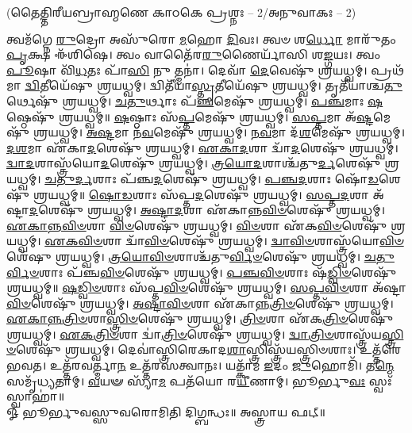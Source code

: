 \centerline{\scriptsize (𑌤𑍈𑌤𑍍𑌤𑌿𑌰𑍀𑌯𑌬𑍍𑌰𑌾𑌹𑍍𑌮𑌣𑍇 𑌕𑌾𑌠𑌕𑍇 𑌪𑍍𑌰𑌶𑍍𑌨𑌃 – 2/𑌅𑌨𑍁𑌵𑌾𑌕𑌃 – 2)}
 𑌤𑍍𑌵𑌮᳴𑌗𑍍𑌨𑍇 \ul{𑌰𑍁}\-𑌦𑍍𑌰𑍋 𑌅𑌸𑍁᳴𑌰𑍋 \ul{𑌮}\-𑌹𑍋 \ul{𑌦𑌿}\-𑌵𑌃। 𑌤𑍍𑌵𑍞 𑌶\-\ul{𑌰𑍍𑌧𑍋} 𑌮𑌾𑌰𑍁᳴𑌤𑌂 \ul{𑌪𑍃}\-𑌕𑍍𑌷 𑌈᳴𑌶𑌿𑌷𑍇।
 𑌤𑍍𑌵𑌂 𑌵𑌾𑌤𑍈᳴𑌰\-\ul{𑌰𑍁}\-𑌣𑍈𑌰𑍍𑌯𑌾᳴𑌸𑌿 𑌶\-\ul{𑌙𑍍𑌗}\-𑌯𑌃। 𑌤𑍍𑌵𑌂 \ul{𑌪𑍂}\-𑌷𑌾 𑌵𑌿᳴\-\ul{𑌧}\-𑌤𑌃 𑌪𑌾᳴\-\ul{𑌸𑌿} 𑌨𑍁 𑌤𑍍𑌮𑌨𑌾॑।
 𑌦𑍇𑌵𑌾᳴ \ul{𑌦𑍇}\-𑌵𑍇𑌷𑍁᳴ 𑌶𑍍𑌰𑌯𑌧𑍍𑌵𑌮𑍍। 𑌪𑍍𑌰𑌥᳴𑌮𑌾 \ul{𑌦𑍍𑌵𑌿}\-𑌤𑍀𑌯𑍇᳴𑌷𑍁 𑌶𑍍𑌰𑌯𑌧𑍍𑌵𑌮𑍍।
 𑌦𑍍𑌵𑌿𑌤𑍀᳴𑌯𑌾\-\ul{𑌸𑍍𑌤𑍃}\-𑌤𑍀𑌯𑍇᳴𑌷𑍁 𑌶𑍍𑌰𑌯𑌧𑍍𑌵𑌮𑍍। 𑌤𑍃𑌤𑍀᳴𑌯𑌾𑌶𑍍𑌚\-\ul{𑌤𑍁}\-𑌰𑍍𑌥𑍇𑌷𑍁᳴ 𑌶𑍍𑌰𑌯𑌧𑍍𑌵𑌮𑍍।
 \ul{𑌚}\-\-\ul{𑌤𑍁}\-𑌰𑍍𑌥𑌾𑌃 𑌪᳴\-\ul{𑌞𑍍𑌚}\-𑌮𑍇𑌷𑍁᳴ 𑌶𑍍𑌰𑌯𑌧𑍍𑌵𑌮𑍍। \ul{𑌪}\-\-\ul{𑌞𑍍𑌚}\-𑌮𑌾𑌃 \ul{𑌷}\-𑌷𑍍𑌠𑍇𑌷𑍁᳴ 𑌶𑍍𑌰𑌯𑌧𑍍𑌵𑌮𑍍॥
 \ul{𑌷}\-𑌷𑍍𑌠𑌾𑌃 𑌸᳴\-\ul{𑌪𑍍𑌤}\-𑌮𑍇𑌷𑍁᳴ 𑌶𑍍𑌰𑌯𑌧𑍍𑌵𑌮𑍍। \ul{𑌸}\-\-\ul{𑌪𑍍𑌤}\-𑌮𑌾 𑌅᳴\-\ul{𑌷𑍍𑌟}\-𑌮𑍇𑌷𑍁᳴ 𑌶𑍍𑌰𑌯𑌧𑍍𑌵𑌮𑍍।
 \ul{𑌅}\-\-\ul{𑌷𑍍𑌟}\-𑌮𑌾 𑌨᳴\-\ul{𑌵}\-𑌮𑍇𑌷𑍁᳴ 𑌶𑍍𑌰𑌯𑌧𑍍𑌵𑌮𑍍। \ul{𑌨}\-\-\ul{𑌵}\-𑌮𑌾 𑌦᳴\-\ul{𑌶}\-𑌮𑍇𑌷𑍁᳴ 𑌶𑍍𑌰𑌯𑌧𑍍𑌵𑌮𑍍।
 \ul{𑌦}\-\-\ul{𑌶}\-𑌮𑌾 𑌏᳴𑌕𑌾\-\ul{𑌦}\-𑌶𑍇𑌷𑍁᳴ 𑌶𑍍𑌰𑌯𑌧𑍍𑌵𑌮𑍍। \ul{𑌏}\-\-\ul{𑌕𑌾}\-\-\ul{𑌦}\-𑌶𑌾 𑌦𑍍𑌵𑌾᳴\-\ul{𑌦}\-𑌶𑍇𑌷𑍁᳴ 𑌶𑍍𑌰𑌯𑌧𑍍𑌵𑌮𑍍।
 \ul{𑌦𑍍𑌵𑌾}\-\-\ul{𑌦}\-𑌶𑌾𑌸𑍍𑌤𑍍𑌰᳴𑌯𑍋\-\ul{𑌦}\-𑌶𑍇𑌷𑍁᳴ 𑌶𑍍𑌰𑌯𑌧𑍍𑌵𑌮𑍍। \ul{𑌤𑍍𑌰}\-\-\ul{𑌯𑍋}\-\-\ul{𑌦}\-𑌶𑌾𑌶𑍍𑌚᳴𑌤𑍁\-\ul{𑌰𑍍𑌦}\-𑌶𑍇𑌷𑍁᳴ 𑌶𑍍𑌰𑌯𑌧𑍍𑌵𑌮𑍍।
 \ul{𑌚}\-\-\ul{𑌤𑍁}\-\-\ul{𑌰𑍍𑌦}\-𑌶𑌾𑌃 𑌪᳴𑌞𑍍𑌚\-\ul{𑌦}\-𑌶𑍇𑌷𑍁᳴ 𑌶𑍍𑌰𑌯𑌧𑍍𑌵𑌮𑍍। \ul{𑌪}\-\-\ul{𑌞𑍍𑌚}\-\-\ul{𑌦}\-𑌶𑌾𑌃 𑌷𑍋᳴\-\ul{𑌡}\-𑌶𑍇𑌷𑍁᳴ 𑌶𑍍𑌰𑌯𑌧𑍍𑌵𑌮𑍍॥
 \ul{𑌷𑍋}\-\-\ul{𑌡}\-𑌶𑌾𑌃 𑌸᳴𑌪𑍍𑌤\-\ul{𑌦}\-𑌶𑍇𑌷𑍁᳴ 𑌶𑍍𑌰𑌯𑌧𑍍𑌵𑌮𑍍। \ul{𑌸}\-\-\ul{𑌪𑍍𑌤}\-\-\ul{𑌦}\-𑌶𑌾 𑌅᳴𑌷𑍍𑌟𑌾\-\ul{𑌦}\-𑌶𑍇𑌷𑍁᳴ 𑌶𑍍𑌰𑌯𑌧𑍍𑌵𑌮𑍍। \ul{𑌅}\-\-\ul{𑌷𑍍𑌟𑌾}\-\-\ul{𑌦}\-𑌶𑌾 𑌏᳴𑌕𑌾𑌨𑍍𑌨\-\ul{𑌵𑌿}\-\-\ul{𑍞}\-𑌶𑍇𑌷𑍁᳴ 𑌶𑍍𑌰𑌯𑌧𑍍𑌵𑌮𑍍। \ul{𑌏}\-\-\ul{𑌕𑌾}\-\-\ul{𑌨𑍍𑌨}\-\-\ul{𑌵𑌿}\-\-\ul{𑍞}\-𑌶𑌾 \ul{𑌵𑌿}\-\-\ul{𑍞}\-𑌶𑍇𑌷𑍁᳴ 𑌶𑍍𑌰𑌯𑌧𑍍𑌵𑌮𑍍। \ul{𑌵𑌿}\-\-\ul{𑍞}\-𑌶𑌾 𑌏᳴𑌕\-\ul{𑌵𑌿}\-\-\ul{𑍞}\-𑌶𑍇𑌷𑍁᳴ 𑌶𑍍𑌰𑌯𑌧𑍍𑌵𑌮𑍍। \ul{𑌏}\-\-\ul{𑌕}\-\-\ul{𑌵𑌿}\-\-\ul{𑍞}\-𑌶𑌾 𑌦𑍍𑌵𑌾᳴\-\ul{𑌵𑌿}\-\-\ul{𑍞}\-𑌶𑍇𑌷𑍁᳴ 𑌶𑍍𑌰𑌯𑌧𑍍𑌵𑌮𑍍। \ul{𑌦𑍍𑌵𑌾}\-\-\ul{𑌵𑌿}\-\-\ul{𑍞}\-𑌶𑌾𑌸𑍍𑌤𑍍𑌰᳴𑌯𑍋\-\ul{𑌵𑌿}\-\-\ul{𑍞}\-𑌶𑍇᳴𑌷𑍁 𑌶𑍍𑌰𑌯𑌧𑍍𑌵𑌮𑍍। \ul{𑌤𑍍𑌰}\-\-\ul{𑌯𑍋}\-\-\ul{𑌵𑌿}\-\-\ul{𑍞}\-𑌶𑌾𑌶𑍍𑌚᳴𑌤𑍁\-\ul{𑌰𑍍𑌵𑌿}\-\-\ul{𑍞}\-𑌶𑍇𑌷𑍁᳴ 𑌶𑍍𑌰𑌯𑌧𑍍𑌵𑌮𑍍। \ul{𑌚}\-\-\ul{𑌤𑍁}\-\-\ul{𑌰𑍍𑌵𑌿}\-\-\ul{𑍞}\-𑌶𑌾𑌃 𑌪᳴𑌞𑍍𑌚\-\ul{𑌵𑌿}\-\-\ul{𑍞}\-𑌶𑍇𑌷𑍁᳴ 𑌶𑍍𑌰𑌯𑌧𑍍𑌵𑌮𑍍। \ul{𑌪}\-\-\ul{𑌞𑍍𑌚}\-\-\ul{𑌵𑌿}\-\-\ul{𑍞}\-𑌶𑌾𑌃 𑌷᳴\-\ul{𑌡𑍍𑌵𑌿}\-\-\ul{𑍞}\-𑌶𑍇𑌷𑍁᳴ 𑌶𑍍𑌰𑌯𑌧𑍍𑌵𑌮𑍍॥
 \ul{𑌷}\-\-\ul{𑌡𑍍𑌵𑌿}\-\-\ul{𑍞}\-𑌶𑌾𑌃 𑌸᳴𑌪𑍍𑌤\-\ul{𑌵𑌿}\-\-\ul{𑍞}\-𑌶𑍇𑌷𑍁᳴ 𑌶𑍍𑌰𑌯𑌧𑍍𑌵𑌮𑍍। \ul{𑌸}\-\-\ul{𑌪𑍍𑌤}\-\-\ul{𑌵𑌿}\-\-\ul{𑍞}\-𑌶𑌾 𑌅᳴𑌷𑍍𑌟𑌾\-\ul{𑌵𑌿}\-\-\ul{𑍞}\-𑌶𑍇𑌷𑍁᳴ 𑌶𑍍𑌰𑌯𑌧𑍍𑌵𑌮𑍍।
 \ul{𑌅}\-\-\ul{𑌷𑍍𑌟𑌾}\-\-\ul{𑌵𑌿}\-\-\ul{𑍞}\-𑌶𑌾 𑌏᳴𑌕𑌾𑌨𑍍𑌨\-\ul{𑌤𑍍𑌰𑌿}\-\-\ul{𑍞}\-𑌶𑍇𑌷𑍁᳴ 𑌶𑍍𑌰𑌯𑌧𑍍𑌵𑌮𑍍। \ul{𑌏}\-\-\ul{𑌕𑌾}\-\-\ul{𑌨𑍍𑌨}\-\-\ul{𑌤𑍍𑌰𑌿}\-\-\ul{𑍞}\-𑌶𑌾\-\ul{𑌸𑍍𑌤𑍍𑌰𑌿}\-\-\ul{𑍞}\-𑌶𑍇𑌷𑍁᳴ 𑌶𑍍𑌰𑌯𑌧𑍍𑌵𑌮𑍍।
 \ul{𑌤𑍍𑌰𑌿}\-\-\ul{𑍞}\-𑌶𑌾 𑌏᳴𑌕\-\ul{𑌤𑍍𑌰𑌿}\-\-\ul{𑍞}\-𑌶𑍇𑌷𑍁᳴ 𑌶𑍍𑌰𑌯𑌧𑍍𑌵𑌮𑍍। \ul{𑌏}\-\-\ul{𑌕}\-\-\ul{𑌤𑍍𑌰𑌿}\-\-\ul{𑍞}\-𑌶𑌾 𑌦𑍍𑌵𑌾॑\-\ul{𑌤𑍍𑌰𑌿}\-\-\ul{𑍞}\-𑌶𑍇𑌷𑍁᳴ 𑌶𑍍𑌰𑌯𑌧𑍍𑌵𑌮𑍍।
 \ul{𑌦𑍍𑌵𑌾}\-\-\ul{𑌤𑍍𑌰𑌿}\-\-\ul{𑍞}\-𑌶𑌾𑌸𑍍𑌤𑍍𑌰᳴𑌯\-\ul{𑌸𑍍𑌤𑍍𑌰𑌿}\-\-\ul{𑍞}\-𑌶𑍇𑌷𑍁᳴ 𑌶𑍍𑌰𑌯𑌧𑍍𑌵𑌮𑍍। 𑌦𑍇𑌵𑌾॑𑌸𑍍𑌤𑍍𑌰𑌿𑌰𑍇𑌕𑌾𑌦\-\ul{𑌶𑌾}\-𑌸𑍍𑌤𑍍𑌰𑌿𑌸𑍍𑌤𑍍𑌰᳴𑌯𑌸𑍍𑌤𑍍𑌰𑌿𑍞𑌶𑌾𑌃।
 𑌉𑌤𑍍𑌤᳴𑌰𑍇 𑌭𑌵𑌤। 𑌉𑌤𑍍𑌤᳴𑌰𑌵𑌰𑍍𑌤𑍍𑌮𑌾\-\ul{𑌨} 𑌉𑌤𑍍𑌤᳴𑌰𑌸𑌤𑍍𑌵𑌾𑌨𑌃।
 𑌯𑌤𑍍𑌕𑌾᳴𑌮 \ul{𑌇}\-𑌦𑌂 \ul{𑌜𑍁}\-𑌹𑍋𑌮𑌿᳴। 𑌤\-\ul{𑌨𑍍𑌮𑍇} 𑌸𑌮𑍃᳴𑌧𑍍𑌯𑌤𑌾𑌮𑍍।
 \ul{𑌵}\-𑌯𑍟 𑌸𑍍𑌯𑌾᳴\-\ul{𑌮} 𑌪𑌤᳴𑌯𑍋 𑌰\-\ul{𑌯𑍀}\-𑌣𑌾𑌮𑍍। 𑌭𑍂𑌰𑍍𑌭𑍁\-\ul{𑌵𑌃} 𑌸𑍍𑌵𑌃᳴ 𑌸𑍍𑌵𑌾𑌹𑌾॑॥\\
𑍐 𑌭𑍂𑌰𑍍𑌭𑍁𑌵𑌸𑍍𑌸𑍁𑌵𑌰𑍋𑌮𑌿𑌤𑌿 𑌦𑌿𑌗𑍍𑌬𑌨𑍍𑌧𑌃॥ 𑌅𑌸𑍍𑌤𑍍𑌰𑌾𑌯 𑌫𑌟𑍍॥

